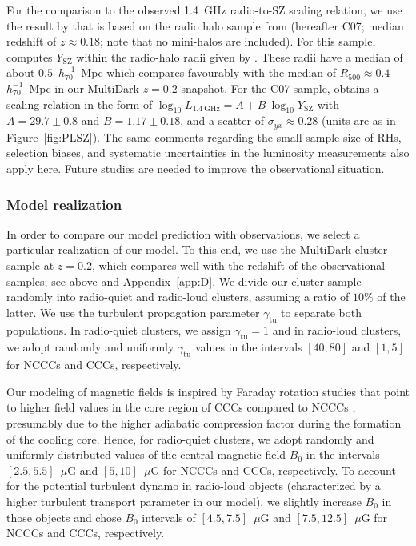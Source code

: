 \documentclass[traditabstract]{aa}
\newcommand{\rmn}{\mathrm}
\begin{document}
For the comparison to the observed 1.4~GHz radio-to-SZ scaling relation, we use
the result by \cite{2012MNRAS.421L.112B} that is based on the radio halo sample
from \cite{2007MNRAS.378.1565C} (hereafter C07; median redshift of $z \approx
0.18$; note that no mini-halos are included). For this sample,
\cite{2012MNRAS.421L.112B} computes $Y_{\rmn{SZ}}$ within the radio-halo radii
given by \cite{2007MNRAS.378.1565C}. These radii have a median of about
$0.5$~$h_{70}^{-1}$~Mpc which compares favourably with the median of $R_{500}
\approx 0.4$~$h_{70}^{-1}$~Mpc in our MultiDark $z = 0.2$ snapshot. For the C07
sample, \cite{2012MNRAS.421L.112B} obtains a scaling relation in the form of
$\log_{10} L_{1.4~\rmn{GHz}} = A + B~\log_{10} Y_{\rmn{SZ}}$ with $A=29.7\pm0.8$
and $B=1.17\pm0.18$, and a scatter of $\sigma_{yx} \approx 0.28$ (units are as
in Figure~\ref{fig:PLSZ}). The same comments regarding the small sample size of
RHs, selection biases, and systematic uncertainties in the luminosity
measurements also apply here. Future studies are needed to improve the
observational situation.


\subsubsection{Model realization}

In order to compare our model prediction with observations, we select a
particular realization of our model. To this end, we use the MultiDark cluster
sample at $z=0.2$, which compares well with the redshift of the observational
samples; see above and Appendix~\ref{app:D}. We divide our cluster sample
randomly into radio-quiet and radio-loud clusters, assuming a ratio of $10\%$ of
the latter. We use the turbulent propagation parameter $\gamma_{\rmn{tu}}$ to
separate both populations. In radio-quiet clusters, we assign
$\gamma_{\rmn{tu}}=1$ and in radio-loud clusters, we adopt randomly and
uniformly $\gamma_{\rmn{tu}}$ values in the intervals $[40,80]$ and $[1,5]$ for
NCCCs and CCCs, respectively.

Our modeling of magnetic fields is inspired by Faraday rotation studies that
point to higher field values in the core region of CCCs compared to NCCCs
\citep{2011A&A...529A..13K, 2010A&A...513A..30B}, presumably due to the higher
adiabatic compression factor during the formation of the cooling core. Hence,
for radio-quiet clusters, we adopt randomly and uniformly distributed values of
the central magnetic field $B_0$ in the intervals $[2.5,5.5]$~$\mu$G and
$[5,10]$~$\mu$G for NCCCs and CCCs, respectively. To account for the potential
turbulent dynamo in radio-loud objects (characterized by a higher turbulent
transport parameter in our model), we slightly increase $B_0$ in those objects
and chose $B_0$ intervals of $[4.5,7.5]$~$\mu$G and $[7.5,12.5]$~$\mu$G for
NCCCs and CCCs, respectively.
\end{document}
